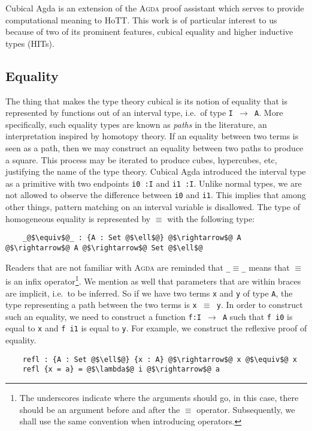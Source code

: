 \documentclass[12pt,twoside,maitrise]{dms}
\theoremstyle{definition}
\numberwithin{equation}{section}
\numberwithin{table}{chapter}
\numberwithin{figure}{chapter}
\newcommand\id[1] {\texttt{#1}}
\newcommand\fn[1] {\texttt{#1}}
\def\Agda{\textsc{Agda}\xspace}
\begin{document}
Cubical Agda\cite{vezzosi2021cubical} is an extension of the \Agda{} proof
assistant which serves to provide computational meaning to HoTT. This work is
of particular interest to us because of two of its prominent features, cubical
equality and higher inductive types (HITs).

\subsection{Equality}
The thing that makes the type theory cubical is its notion of equality that is
represented by functions out of an interval type, i.e.\ of type \fn{I
  $\rightarrow$ A}. More specifically, such equality types are known as
\emph{paths} in the literature, an interpretation inspired by homotopy theory.
If an equality between two terms is seen as a path, then we may construct an
equality between two paths to produce a square. This process may be iterated to
produce cubes, hypercubes, etc, justifying the name of the type theory. Cubical
Agda introduced the interval type as a primitive with two endpoints \fn{i0
  :\@ I} and \fn{i1 :\@ I}. Unlike normal types, we are not allowed to
observe the difference between \id{i0} and \id{i1}. This implies that among
other things, pattern matching on an interval variable is disallowed. The type
of homogeneous equality is represented by $\equiv$ with the following type:

\begin{verbatim}
    _@$\equiv$@_ : {A : Set @$\ell$@} @$\rightarrow$@ A @$\rightarrow$@ A @$\rightarrow$@ Set @$\ell$@
\end{verbatim}

Readers that are not familiar with \Agda{} are reminded that \fn{\_$\equiv$\_}
means that $\equiv$ is an infix operator\footnote{The underscores indicate where
the arguments should go, in this case, there should be an argument before and
after the $\equiv$ operator. Subsequently, we shall use the same convention when
introducing operators.}. We mention as well that parameters that are within
braces are implicit, i.e.\ to be inferred. So if we have two terms \id{x} and
\id{y} of type \id{A}, the type representing a path between the two terms is
\fn{x $\equiv$ y}. In order to construct such an equality, we need to construct
a function \id{f:I $\rightarrow$ A} such that \fn{f i0} is equal to \id{x} and
\fn{f i1} is equal to \id{y}. For example, we construct the reflexive proof of
equality.

\begin{verbatim}
    refl : {A : Set @$\ell$@} {x : A} @$\rightarrow$@ x @$\equiv$@ x
    refl {x = a} = @$\lambda$@ i @$\rightarrow$@ a
\end{verbatim}
\end{document}
